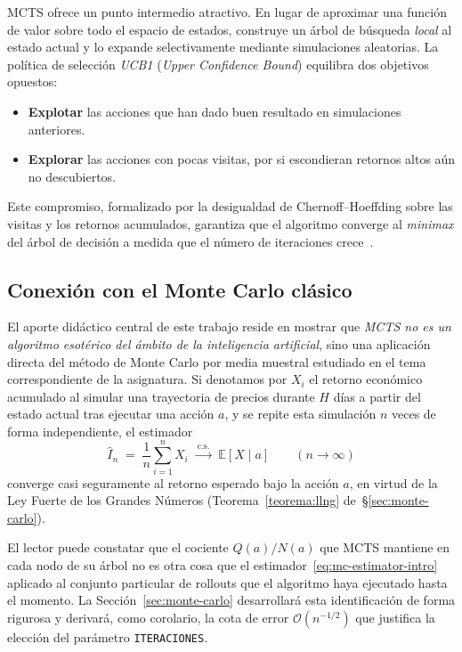 MCTS ofrece un punto intermedio atractivo. En lugar de aproximar una función de valor sobre todo el espacio de estados, construye un árbol de búsqueda \emph{local} al estado actual y lo expande selectivamente mediante simulaciones aleatorias. La política de selección \emph{UCB1} (\emph{Upper Confidence Bound}) equilibra dos objetivos opuestos:
\begin{itemize}
    \item \textbf{Explotar} las acciones que han dado buen resultado en simulaciones anteriores.
    \item \textbf{Explorar} las acciones con pocas visitas, por si escondieran retornos altos aún no descubiertos.
\end{itemize}
Este compromiso, formalizado por la desigualdad de Chernoff--Hoeffding sobre las visitas y los retornos acumulados, garantiza que el algoritmo converge al \emph{minimax} del árbol de decisión a medida que el número de iteraciones crece~\cite{kocsis2006}.

\subsection{Conexión con el Monte Carlo clásico}
\label{subsec:puente-arandiga}

El aporte didáctico central de este trabajo reside en mostrar que \emph{MCTS no es un algoritmo esotérico del ámbito de la inteligencia artificial}, sino una aplicación directa del método de Monte Carlo por media muestral estudiado en el tema correspondiente de la asignatura. Si denotamos por $X_i$ el retorno económico acumulado al simular una trayectoria de precios durante $H$ días a partir del estado actual tras ejecutar una acción $a$, y se repite esta simulación $n$ veces de forma independiente, el estimador
\begin{equation}
    \widehat{I}_n \;=\; \frac{1}{n}\sum_{i=1}^{n} X_i \;\xrightarrow{\ \text{c.s.}\ }\; \mathbb{E}[X \mid a]
    \qquad (n \to \infty)
    \label{eq:mc-estimator-intro}
\end{equation}
converge casi seguramente al retorno esperado bajo la acción $a$, en virtud de la Ley Fuerte de los Grandes Números (Teorema~\ref{teorema:llng} de~\S\ref{sec:monte-carlo}).

El lector puede constatar que el cociente $Q(a)/N(a)$ que MCTS mantiene en cada nodo de su árbol no es otra cosa que el estimador~\eqref{eq:mc-estimator-intro} aplicado al conjunto particular de rollouts que el algoritmo haya ejecutado hasta el momento. La Sección~\ref{sec:monte-carlo} desarrollará esta identificación de forma rigurosa y derivará, como corolario, la cota de error $\mathcal{O}(n^{-1/2})$ que justifica la elección del parámetro \texttt{ITERACIONES}.

